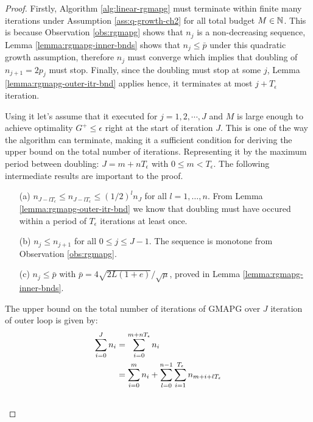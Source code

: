 \documentclass[12pt]{report}
\begin{document}
        \begin{proof}
            Firstly, Algorithm \ref{alg:linear-rgmapg} must terminate within finite many iterations under Assumption \ref{ass:q-growth-ch2} for all total budget $M \in \mathbb N$. 
            This is because Observation \ref{obs:rgmapg} shows that $n_j$ is a non-decreasing sequence, Lemma \ref{lemma:rgmapg-inner-bnds} shows that $n_j \le \bar p$ under this quadratic growth assumption, therefore $n_j$ must converge which implies that doubling of $n_{j + 1} = 2p_{j}$ must stop. 
            Finally, since the doubling must stop at some $j$, Lemma \ref{lemma:rgmapg-outer-itr-bnd} applies hence, it terminates at most $j + T_\epsilon$ iteration. 
            \par
            Using it let's assume that it executed for $j = 1, 2, \cdots, J$ and $M$ is large enough to achieve optimality $G^+ \le \epsilon$ right at the start of iteration $J$.
            This is one of the way the algorithm can terminate, making it a sufficient condition for deriving the upper bound on the total number of iterations. 
            Representing it by the maximum period between doubling: $J = m + nT_\epsilon$ with $0 \le m < T_\epsilon$. 
            The following intermediate results are important to the proof. 
            \begin{enumerate}
                \item [(a)] $n_{J - lT_\epsilon} \le n_{J - lT_\epsilon}\le (1/2)^ln_J$ for all $l = 1, \ldots, n$. From Lemma \ref{lemma:rgmapg-outer-itr-bnd} we know that doubling must have occured within a period of $T_\epsilon$ iterations at least once.
                \item [(b)] $n_{j} \le n_{j + 1}$ for all $0 \le j \le J - 1$. The sequence is monotone from Observation \ref{obs:rgmapg}. 
                \item [(c)] $n_j \le \bar p$ with $\bar p = 4\sqrt{2L(1 + e)}/\sqrt{\mu}$, proved in Lemma \ref{lemma:rgmapg-inner-bnds}. 
            \end{enumerate}
            The upper bound on the total number of iterations of GMAPG over $J$ iteration of outer loop is given by: 
            \begin{align*}
                \sum_{i = 0}^{J} n_i &= \sum_{i = 0}^{m + nT_\epsilon} n_i
                \\
                &= \sum_{i = 0}^{m}n_i + \sum_{l = 0}^{n - 1}\sum_{i = 1}^{T_\epsilon} n_{m + i + lT_\epsilon}
                \\
                &\hspace{-0.5em}

\end{align*}
\end{proof}
\end{document}
